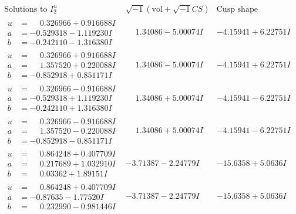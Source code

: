 \documentclass[1p]{elsarticle_modified}
\theoremstyle{definition}
\newcommand{\I}{\sqrt{-1}}
\begin{document}
$$\begin{array}{c|c|c}  
\text{Solutions to }I^u_{2}& \I (\text{vol} + \sqrt{-1}CS) & \text{Cusp shape}\\
 \hline 
\begin{aligned}
u &= \phantom{-}0.326966 + 0.916688 I \\
a &= -0.529318 - 1.119230 I \\
b &= -0.242110 - 1.316380 I\end{aligned}
 & \phantom{-}1.34086 - 5.00074 I & -4.15941 + 6.22751 I \\ \hline\begin{aligned}
u &= \phantom{-}0.326966 + 0.916688 I \\
a &= \phantom{-}1.357520 + 0.220088 I \\
b &= -0.852918 + 0.851171 I\end{aligned}
 & \phantom{-}1.34086 - 5.00074 I & -4.15941 + 6.22751 I \\ \hline\begin{aligned}
u &= \phantom{-}0.326966 - 0.916688 I \\
a &= -0.529318 + 1.119230 I \\
b &= -0.242110 + 1.316380 I\end{aligned}
 & \phantom{-}1.34086 + 5.00074 I & -4.15941 - 6.22751 I \\ \hline\begin{aligned}
u &= \phantom{-}0.326966 - 0.916688 I \\
a &= \phantom{-}1.357520 - 0.220088 I \\
b &= -0.852918 - 0.851171 I\end{aligned}
 & \phantom{-}1.34086 + 5.00074 I & -4.15941 - 6.22751 I \\ \hline\begin{aligned}
u &= \phantom{-}0.864248 + 0.407709 I \\
a &= \phantom{-}0.217689 + 1.032910 I \\
b &= \phantom{-}0.03362 + 1.89151 I\end{aligned}
 & -3.71387 - 2.24779 I & -15.6358 + 5.0636 I \\ \hline\begin{aligned}
u &= \phantom{-}0.864248 + 0.407709 I \\
a &= -0.87635 - 1.77520 I \\
b &= \phantom{-}0.232990 - 0.981446 I\end{aligned}
 & -3.71387 - 2.24779 I & -15.6358 + 5.0636 I \\ \hline\begin{aligned}

\end{aligned}
\end{array}$$
\end{document}
